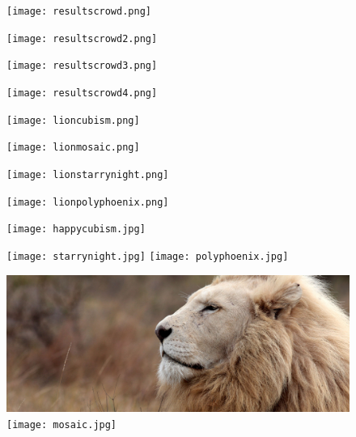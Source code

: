 \documentclass[17pt]{extarticle}
\begin{document}
  	
\newpage


\begin{figure}[h]
  		\texttt{[image: resultscrowd.png]}
\end{figure}

\begin{figure}[h]
  		\texttt{[image: resultscrowd2.png]}
\end{figure}

\begin{figure}[h]
  		\texttt{[image: resultscrowd3.png]}
\end{figure}

\begin{figure}[h]
  		\texttt{[image: resultscrowd4.png]}
\end{figure}




\begin{figure}
\begin{minipage}{.5\textwidth}
  \texttt{[image: lioncubism.png]}

  		\texttt{[image: lionmosaic.png]}
\end{minipage}%
\begin{minipage}{.5\textwidth}
  \texttt{[image: lionstarrynight.png]}

  		\texttt{[image: lionpolyphoenix.png]}
\end{minipage}
\end{figure}

\begin{figure}
\begin{minipage}{.5\textwidth}
    	\texttt{[image: happycubism.jpg]}

    	\texttt{[image: starrynight.jpg]}
    		\texttt{[image: polyphoenix.jpg]}
\end{minipage}%
\begin{minipage}{.5\textwidth}
		\includegraphics[scale=0.2]{lion.png}
  	\texttt{[image: mosaic.jpg]}
\end{minipage}
\end{figure}
\end{document}
